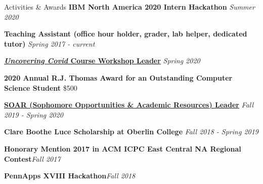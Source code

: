 \documentclass{resume}
\begin{document}
\begin{rSection}{Activities \& Awards}
{\bf IBM North America 2020 Intern Hackathon} \hfill {\em Summer 2020} 

{\bf Teaching Assistant (office hour holder, grader, lab helper, dedicated tutor)} \hfill {\em Spring 2017 - current} 




{\bf \href{https://www.oberlin.edu/admissions-and-aid/for-accepted-students/virtual-visits/covid-19-course}{\textit{Uncovering Covid} Course Workshop Leader}} \hfill{\em Spring 2020} 

{\bf 2020 Annual R.J. Thomas Award for an Outstanding Computer Science Student} \hfill{\$500} 

{\bf \href{https://www.oberlin.edu/career/set/soar/soar-leaders}{SOAR (Sophomore Opportunities \& Academic Resources) Leader}} \hfill{\em Fall 2019 - Spring 2020} 



{\bf Clare Boothe Luce Scholarship at Oberlin College} \hfill{\em Fall 2018 - Spring 2019}


{\bf Honorary Mention 2017 in ACM ICPC East Central NA Regional Contest}\hfill{\em Fall 2017}


{\bf PennApps XVIII Hackathon}\hfill{\em Fall 2018}
\end{rSection}
\end{document}
